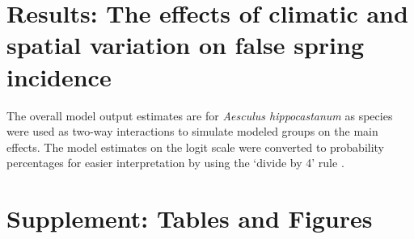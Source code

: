 \documentclass{article}\usepackage[]{graphicx}\usepackage[]{color}
\begin{document}
{\section*{Results: The effects of climatic and spatial variation on false spring incidence}
The overall model output estimates are for \textit{Aesculus hippocastanum} as species were used as two-way interactions to simulate modeled groups on the main effects. The model estimates on the logit scale were converted to probability percentages for easier interpretation by using the `divide by 4' rule \citep{Gelman2006}. %

\newpage
\nocite{NPN2019}


\newpage
\section*{Supplement: Tables and Figures}
  
}
\end{document}
